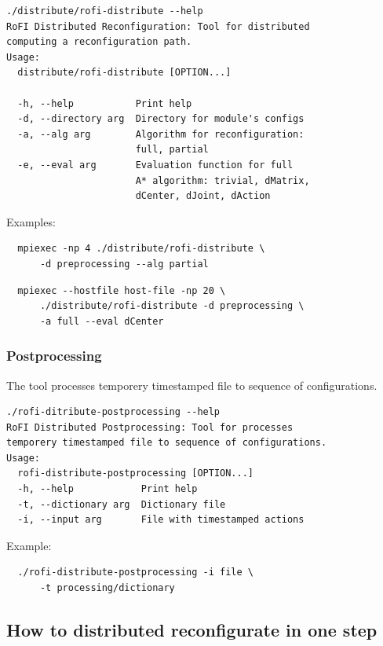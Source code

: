 \documentclass[
  digital, %
  oneside, %
  notable,   %
  lof,     %
  nolot,     %
]{fithesis3}
\begin{document}
\begin{verbatim}
./distribute/rofi-distribute --help
RoFI Distributed Reconfiguration: Tool for distributed 
computing a reconfiguration path.
Usage:
  distribute/rofi-distribute [OPTION...]

  -h, --help           Print help
  -d, --directory arg  Directory for module's configs
  -a, --alg arg        Algorithm for reconfiguration: 
                       full, partial
  -e, --eval arg       Evaluation function for full 
                       A* algorithm: trivial, dMatrix, 
                       dCenter, dJoint, dAction
\end{verbatim}

Examples:

\begin{verbatim}
  mpiexec -np 4 ./distribute/rofi-distribute \
      -d preprocessing --alg partial 
\end{verbatim}

\begin{verbatim}
  mpiexec --hostfile host-file -np 20 \
      ./distribute/rofi-distribute -d preprocessing \ 
      -a full --eval dCenter
\end{verbatim}

\subsubsection*{Postprocessing}

The tool processes temporery timestamped file to sequence of configurations. 

\begin{verbatim}
./rofi-ditribute-postprocessing --help
RoFI Distributed Postprocessing: Tool for processes 
temporery timestamped file to sequence of configurations. 
Usage:
  rofi-distribute-postprocessing [OPTION...]
  -h, --help            Print help
  -t, --dictionary arg  Dictionary file
  -i, --input arg       File with timestamped actions 
\end{verbatim}

Example: 

\begin{verbatim}
  ./rofi-distribute-postprocessing -i file \
      -t processing/dictionary
\end{verbatim}

\subsection*{How to distributed reconfigurate in one step}
\end{document}
